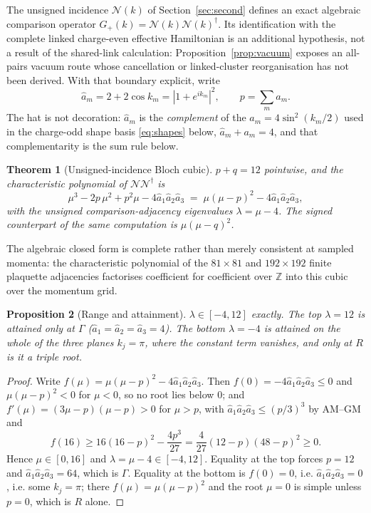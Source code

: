 \documentclass[11pt]{article}
\theoremstyle{plain}
\newtheorem{theorem}{Theorem}
\newtheorem{proposition}[theorem]{Proposition}
\theoremstyle{definition}
\theoremstyle{remark}
\newcommand{\chk}[1]{}
\newcommand{\dg}{^{\dagger}}
\begin{document}
The unsigned incidence $\mathcal N(k)$ of Section~\ref{sec:second} defines an
exact algebraic comparison operator
$G_+(k)=\mathcal N(k)\mathcal N(k)\dg$. Its identification with the complete
linked charge-even effective Hamiltonian is an additional hypothesis, not a
result of the shared-link calculation: Proposition~\ref{prop:vacuum} exposes
an all-pairs vacuum route whose cancellation or linked-cluster reorganisation
has not been derived. With that boundary explicit, write
\[
  \hat a_m=2+2\cos k_m=|1+e^{ik_m}|^2,\qquad p=\sum_m \hat a_m .
\]
The hat is not decoration: $\hat a_m$ is the \emph{complement} of the
$a_m=4\sin^2(k_m/2)$ used in the charge-odd shape basis \eqref{eq:shapes}
below,
$\hat a_m+a_m=4$, and that complementarity is the sum rule below.

\begin{theorem}[Unsigned-incidence Bloch cubic]\label{thm:evencubic}
$p+q=12$ pointwise, and the characteristic polynomial of
$\mathcal N\mathcal N\dg$ is
\[
  \mu^3-2p\,\mu^2+p^2\mu-4\hat a_1\hat a_2\hat a_3
  \;=\;\mu(\mu-p)^2-4\hat a_1\hat a_2\hat a_3 ,
\]
with the unsigned comparison-adjacency eigenvalues $\lambda=\mu-4$. The signed
counterpart of the same computation is $\mu(\mu-q)^2$.
\end{theorem}
\chk{the C-even characteristic polynomial is mu(mu - p)\^{}2 = 4 a\_1 a\_2 a\_3}
\chk{p + q = 12: one zone function runs both sectors}

The algebraic closed form is complete rather than merely consistent at sampled momenta:
the characteristic polynomial of the $81\times81$ and $192\times192$ finite
plaquette adjacencies factorises coefficient for coefficient over $\mathbb Z$
into this cubic over the momentum grid.
\chk{the Bloch cubic IS the finite L = 3 and L = 4 plaquette spectrum, exactly}

\begin{proposition}[Range and attainment]\label{prop:evenrange}
$\lambda\in[-4,12]$ exactly. The top $\lambda=12$ is attained only at $\Gamma$
($\hat a_1=\hat a_2=\hat a_3=4$). The bottom $\lambda=-4$ is attained on the
whole of the three planes $k_j=\pi$, where the constant term vanishes, and only
at $R$ is it a triple root.
\end{proposition}

\begin{proof}
Write $f(\mu)=\mu(\mu-p)^2-4\hat a_1\hat a_2\hat a_3$. Then
$f(0)=-4\hat a_1\hat a_2\hat a_3\le0$ and $\mu(\mu-p)^2<0$ for $\mu<0$, so no
root lies below $0$; and $f'(\mu)=(3\mu-p)(\mu-p)>0$ for $\mu>p$, with
$\hat a_1\hat a_2\hat a_3\le(p/3)^3$ by AM--GM and
\[
 f(16)\ge16(16-p)^2-\frac{4p^3}{27}
 =\frac4{27}(12-p)(48-p)^2\ge0.
\]
Hence $\mu\in[0,16]$ and
$\lambda=\mu-4\in[-4,12]$. Equality at the top forces $p=12$ and
$\hat a_1\hat a_2\hat a_3=64$, which is $\Gamma$. Equality at the bottom is
$f(0)=0$, i.e. $\hat a_1\hat a_2\hat a_3=0$, i.e. some $k_j=\pi$; there
$f(\mu)=\mu(\mu-p)^2$ and the root $\mu=0$ is simple unless $p=0$, which is
$R$ alone.
\end{proof}
\chk{the C-even range [-4, 12] is exact, and each edge is attained at one point only}
\chk{the C-even band touches its floor exactly on the three planes k\_j = pi}
\end{document}
